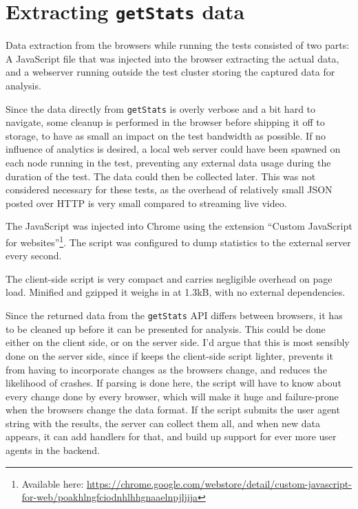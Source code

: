 \chapter{Extracting \texttt{getStats} data}\label{chp:getstats}

Data extraction from the browsers while running the tests consisted of two parts: A JavaScript file that was injected into the browser extracting the actual data, and a webserver running outside the test cluster storing the captured data for analysis.

Since the data directly from \texttt{getStats} is overly verbose and a bit hard to navigate, some cleanup is performed in the browser before shipping it off to storage, to have as small an impact on the test bandwidth as possible. If no influence of analytics is desired, a local web server could have been spawned on each node running in the test, preventing any external data usage during the duration of the test. The data could then be collected later. This was not considered necessary for these tests, as the overhead of relatively small JSON posted over HTTP is very small compared to streaming live video.

The JavaScript was injected into Chrome using the extension ``Custom JavaScript for websites''\footnote{Available here: \url{https://chrome.google.com/webstore/detail/custom-javascript-for-web/poakhlngfciodnhlhhgnaaelnpjljija}}. The script was configured to dump statistics to the external server every second.

The client-side script is very compact and carries negligible overhead on page load. Minified and gzipped it weighs in at 1.3kB, with no external dependencies.

Since the returned data from the \texttt{getStats} API differs between browsers, it has to be cleaned up before it can be presented for analysis. This could be done either on the client side, or on the server side. I'd argue that this is most sensibly done on the server side, since if keeps the client-side script lighter, prevents it from having to incorporate changes as the browsers change, and reduces the likelihood of crashes. If parsing is done here, the script will have to know about every change done by every browser, which will make it huge and failure-prone when the browsers change the data format. If the script submits the user agent string with the results, the server can collect them all, and when new data appears, it can add handlers for that, and build up support for ever more user agents in the backend.


